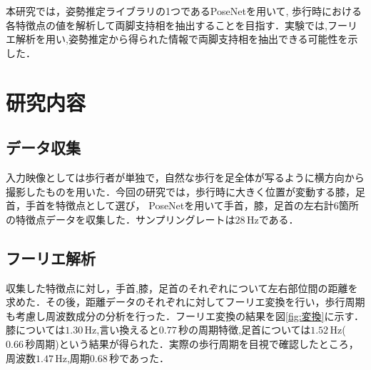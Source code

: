 \documentclass[a4j]{cis-resume}
\begin{document}
本研究では，姿勢推定ライブラリの1つであるPoseNetを用いて,
歩行時における各特徴点の値を解析して両脚支持相を抽出することを目指す．実験では,フーリエ解析を用い,姿勢推定から得られた情報で両脚支持相を抽出できる可能性を示した．
\section{研究内容} \label{sec:details}
\subsection{データ収集}
入力映像としては歩行者が単独で，自然な歩行を足全体が写るように横方向から撮影したものを用いた．今回の研究では，歩行時に大きく位置が変動する膝，足首，手首を特徴点として選び，
PoseNetを用いて手首，膝，足首の左右計6箇所の特徴点データを収集した．サンプリングレートは$28\,\mathrm{Hz}$である．
\subsection{フーリエ解析}
収集した特徴点に対し，手首,膝，足首のそれぞれについて左右部位間の距離を求めた．その後，距離データのそれぞれに対してフーリエ変換を行い，歩行周期も考慮し周波数成分の分析を行った．フーリエ変換の結果を図\ref{fig:変換}に示す．膝については$1.30\,\mathrm{Hz} $,言い換えると$0.77\,\mathrm{秒}$の周期特徴,足首については$1.52\,\mathrm{Hz}$($0.66\,\mathrm{秒}$周期)という結果が得られた．実際の歩行周期を目視で確認したところ，周波数$1.47\,\mathrm{Hz}$,周期$0.68\,\mathrm{秒}$であった．
\end{document}
